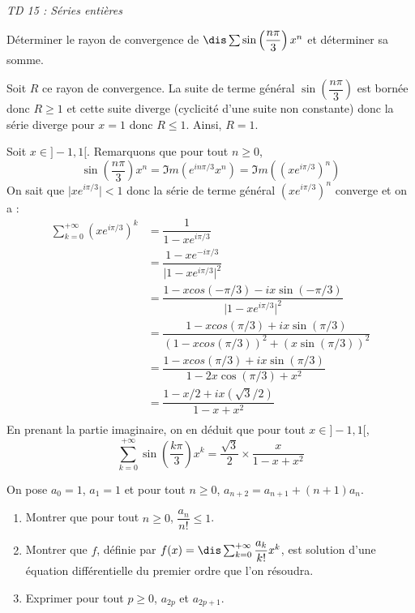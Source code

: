 \documentclass[a4paper,10pt]{report}
\begin{document}
\everymath{\displaystyle}


\begin{center}
\textit{{ {\huge TD 15 : Séries entières}}}
\end{center}

\begin{Exa}
Déterminer le rayon de convergence de $\dis \sum \sin \left( \dfrac{n \pi}{3} \right) x^n$ et déterminer sa somme.
\end{Exa}

\corr Soit $R$ ce rayon de convergence. La suite de terme général $\sin \left( \dfrac{n \pi}{3} \right)$ est bornée donc $R \geq 1$ et cette suite diverge (cyclicité d'une suite non constante) donc la série diverge pour $x=1$ donc $R \leq 1$. Ainsi, $R=1$.

\medskip

\noindent Soit $x \in ]-1,1[$. Remarquons que pour tout $n \geq 0$,
$$ \sin \left( \dfrac{n \pi}{3} \right) x^n = \Im m (e^{in \pi/3} x^n) = \Im m ((xe^{i \pi/3})^n)$$
On sait que $\vert xe^{i \pi/3} \vert <1$ donc la série de terme général $(xe^{i \pi/3})^n$ converge et on a :
\begin{align*}
\sum_{k=0}^{+ \infty} (xe^{i \pi/3})^k & = \dfrac{1}{1-xe^{i \pi/3}} \\
& = \dfrac{1-xe^{-i \pi/3}}{\vert 1-x e^{i \pi/3}\vert^2} \\
& = \dfrac{1-x cos(-\pi/3)-i x\sin(-\pi/3)}{\vert 1-x e^{i \pi/3}\vert^2} \\
& = \dfrac{1-x cos(\pi/3)+i x\sin(\pi/3)}{(1-x cos(\pi/3))^2+ (x\sin(\pi/3))^2} \\
& = \dfrac{1-x cos(\pi/3)+i x\sin(\pi/3)}{1-2x \cos(\pi/3)+x^2} \\
& = \dfrac{1-x/2 +i x(\sqrt{3}/2)}{1-x+x^2} \\
\end{align*}
En prenant la partie imaginaire, on en déduit que pour tout $x \in ]-1,1[$,
$$ \sum_{k=0}^{+ \infty} \sin \left( \dfrac{k \pi}{3} \right) x^k =\dfrac{\sqrt{3}}{2} \times \dfrac{x}{1-x+x^2}$$

\begin{Exa} On pose $a_0=1$, $a_1=1$ et pour tout $n \geq 0$, $a_{n+2} = a_{n+1} + (n+1)a_n$.
\begin{enumerate}
\item Montrer que pour tout $n \geq 0$, $\dfrac{a_n}{n!} \leq 1$.
\item Montrer que $f$, définie par $f(x) = \dis \sum_{k=0}^{+ \infty} \dfrac{a_k}{k!}x^k$, est solution d'une équation différentielle du premier ordre que l'on résoudra.
\item Exprimer pour tout $p \geq 0$, $a_{2p}$ et $a_{2p+1}$.
\end{enumerate}
\end{Exa}
\end{document}
